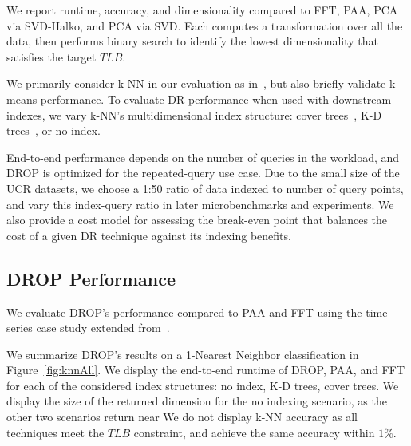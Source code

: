  We report runtime, accuracy, and dimensionality compared to FFT, PAA, PCA via SVD-Halko, and PCA via SVD. 
Each computes a transformation over all the data, then performs binary search to identify the lowest dimensionality that satisfies the target $TLB$. 

We primarily consider k-NN in our evaluation as in~\cite{keogh-study}, but also briefly validate k-means performance.
To evaluate DR performance when used with downstream indexes, we vary k-NN's multidimensional index structure: cover trees~\cite{ctree}, K-D trees~\cite{kdtree}, or no index. 

End-to-end performance depends on the number of queries in the workload, and DROP is optimized for the repeated-query use case. 
Due to the small size of the UCR datasets, we choose a 1:50 ratio of data indexed to number of query points, and vary this index-query ratio in later microbenchmarks and experiments. 
We also provide a cost model for assessing the break-even point that balances the cost of a given DR technique against its indexing benefits.



\subsection{DROP Performance}
\label{subsec:runtime}


We evaluate DROP's performance compared to PAA and FFT using the time series case study extended from~\cite{keogh-study}. 

 We summarize DROP's results on a 1-Nearest Neighbor classification in Figure~\ref{fig:knnAll}.
We display the end-to-end runtime of DROP, PAA, and FFT for each of the considered index structures: no index, K-D trees, cover trees. 
We display the size of the returned dimension for the no indexing scenario, as the other two scenarios return near 
We do not display k-NN accuracy as all techniques meet the $TLB$ constraint, and achieve the same accuracy within $1\%$.

